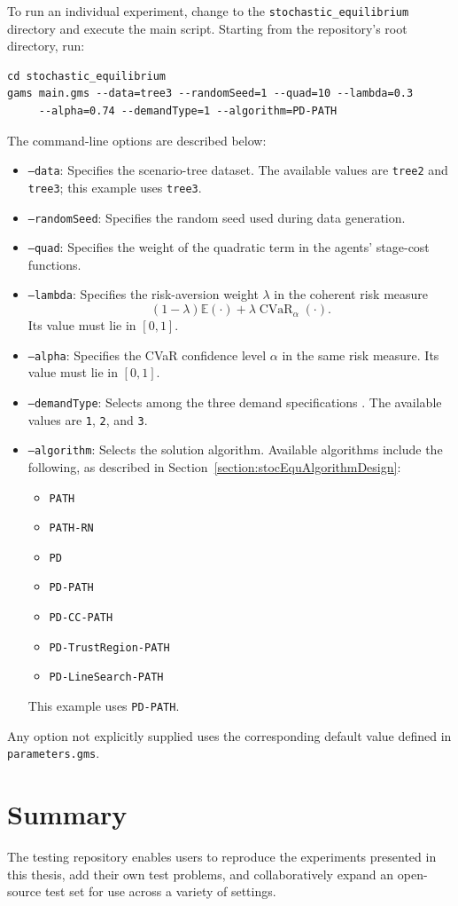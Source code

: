 To run an individual experiment, change to the \texttt{stochastic\_equilibrium} directory and execute the main script. Starting from the repository's root directory, run:

\begin{verbatim}
cd stochastic_equilibrium
gams main.gms --data=tree3 --randomSeed=1 --quad=10 --lambda=0.3 
     --alpha=0.74 --demandType=1 --algorithm=PD-PATH
\end{verbatim}

The command-line options are described below:

\begin{itemize}
    \item \texttt{--data}: Specifies the scenario-tree dataset. The available values are \texttt{tree2} and \texttt{tree3}; this example uses \texttt{tree3}.
    \item \texttt{--randomSeed}: Specifies the random seed used during data generation.
    \item \texttt{--quad}: Specifies the weight of the quadratic term in the agents' stage-cost functions.
    \item \texttt{--lambda}: Specifies the risk-aversion weight $\lambda$ in the coherent risk measure
    \[
        (1-\lambda)\mathbb{E}(\cdot)
        + \lambda \operatorname{CVaR}_{\alpha}(\cdot).
    \]
    Its value must lie in $[0,1]$.
    \item \texttt{--alpha}: Specifies the CVaR confidence level $\alpha$ in the same risk measure. Its value must lie in $[0,1]$.
    \item \texttt{--demandType}: Selects among the three demand specifications \parencite{shenThesis2023}. The available values are \texttt{1}, \texttt{2}, and \texttt{3}.
    \item \texttt{--algorithm}: Selects the solution algorithm. Available algorithms include the following, as described in Section~\ref{section:stocEquAlgorithmDesign}:
    \begin{itemize}
        \item \texttt{PATH}
        \item \texttt{PATH-RN}
        \item \texttt{PD}
        \item \texttt{PD-PATH}
        \item \texttt{PD-CC-PATH}
        \item \texttt{PD-TrustRegion-PATH}
        \item \texttt{PD-LineSearch-PATH}
    \end{itemize}
    This example uses \texttt{PD-PATH}.
\end{itemize}

Any option not explicitly supplied uses the corresponding default value defined in \texttt{parameters.gms}.

\section{Summary}

The testing repository enables users to reproduce the experiments presented in this thesis, add their own test problems, and collaboratively expand an open-source test set for use across a variety of settings.
